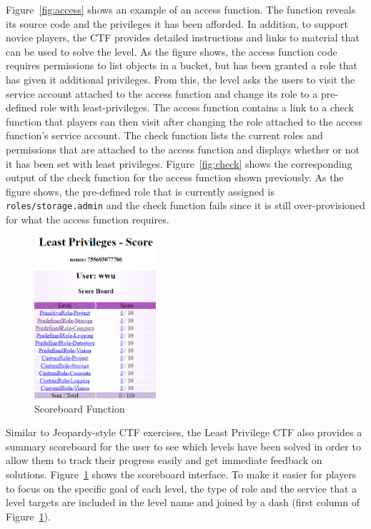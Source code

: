 Figure~\ref{fig:access} shows an example of an access function.  The function reveals its source
code and the privileges it has been afforded.  In addition, to support novice players, the CTF provides detailed instructions and links to material 
that can be used to solve the level.  As the figure shows, the access function code requires
permissions to list objects in a bucket, but has been granted a role that has given it additional privileges.  From this, the level
asks the users to visit the service account attached to the access function and change its role to a pre-defined role with least-privileges.
The access function contains a link to a check function that players can then visit after changing the role attached to the access function's
service account. The check function lists the current roles and permissions that are attached to the access function and
displays whether or not it has been set with least privileges. Figure~\ref{fig:check} shows the corresponding output of the check function
for the access function shown previously.  As the figure shows, the pre-defined role
that is currently assigned is {\tt roles/storage.admin} and the check function fails since it is still over-provisioned for what the
access function requires.

\begin{figure}[!h]
  \centering
  \includegraphics[width=0.4\textwidth]{pic/score}
  \caption {Scoreboard Function}
  \label{fig:score}
\end{figure}

Similar to Jeopardy-style CTF exercises, the Least Privilege CTF also
provides a summary scoreboard for the user to see which levels have been solved in order to allow them to track their progress easily
and get immediate feedback on solutions.  Figure~\ref{fig:score} shows 
the scoreboard interface.  To make it easier for players to focus on the specific goal of each level, the type of role and the service that a level
targets are included in the level name and joined by a dash (first column of Figure~\ref{fig:score}). 

